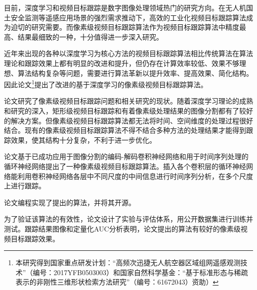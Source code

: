 
\begin{cabstract}
	目前，深度学习和视频目标跟踪是数字图像处理领域热门的研究方向。在无人机国土安全监测等遥感应用场景的强烈需求推动下，高效的工业化视频目标跟踪算法成为迫切的研究需要。而像素级视频目标跟踪算法作为视频目标跟踪算法中精度最高、结果最细致的一种，十分值得进一步深入研究。
	\par
	近年来出现的各种以深度学习为核心方法的视频目标跟踪算法相比传统算法在算法理论和跟踪效果上都有明显的改进和提升，但仍存在计算效率较低、效果不够理想、算法结构复杂等问题，需要进行算法革新以提升效率、提高效果、简化结构。因此论文\footnote{本研究得到国家重点研发计划：“高频次迅捷无人航空器区域组网遥感观测技术”（编号：2017YFB0503003）和国家自然科学基金：“基于标准形态与稀疏表示的非刚性三维形状检索方法研究”（编号：61672043）资助）}提出了改进的基于深度学习的像素级视频目标跟踪算法。
	\par
	论文研究了像素级视频目标跟踪问题和相关研究的现状。随着深度学习理论的成熟和研究的深入，矩形级视频目标跟踪和有着像素级处理结果的图像分割都有了较好的解决方案。但像素级视频目标跟踪算法都无法将时间、空间维度的处理过程很好结合。现有的像素级视频目标跟踪算法不得不结合多种方法的处理结果才能得到跟踪效果，使其结构十分复杂，不利于进一步优化。
	\par
	论文基于已成功应用于图像分割的编码-解码卷积神经网络和用于时间序列处理的循环神经网络提出了一种像素级视频目标跟踪算法。插入各个卷积层的循环神经网络能利用卷积神经网络各层中不同尺度的中间信息进行时间序列分析，在多个尺度上进行跟踪。
	\par
	论文编程实现了提出的算法，并将其开源。
	\par
	为了验证该算法的有效性，论文设计了实验与评估体系，用公开数据集进行训练并测试。跟踪结果图像和定量化AUC分析表明，论文提出的算法有较好的像素级视频目标跟踪效果。
\end{cabstract}

